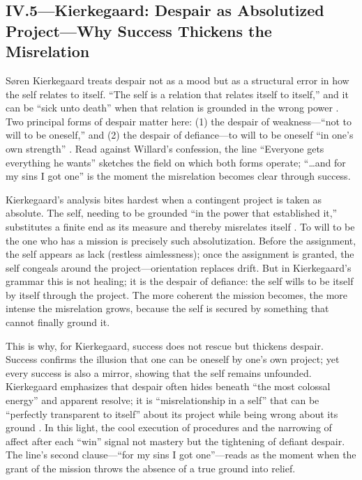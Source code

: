 \subsection*{IV.5—Kierkegaard: Despair as Absolutized Project—Why Success Thickens the
	Misrelation}
\label{ssec:iii-kierkegaard}
Søren Kierkegaard treats despair not as a mood but as a structural error in how the self relates
to itself. ``The self is a relation that relates itself to itself,'' and it can be ``sick unto
death'' when that relation is grounded in the wrong power
\parencite[pp.~49--52]{KierkegaardSUD1980}.
Two principal forms of despair matter here: (1) the despair of weakness—``not to will to be
oneself,'' and (2) the despair of defiance—to will to be oneself ``in one's own strength''
\parencite[pp.~52--61, 69--73]{KierkegaardSUD1980}. Read against Willard's confession, the line
``Everyone gets everything he wants'' sketches the field on which both forms operate;
``\ldots and for my sins I got one'' is the moment the misrelation becomes clear through
success.

Kierkegaard's analysis bites hardest when a contingent project is taken as absolute. The self,
needing to be grounded ``in the power that established it,'' substitutes a finite end as its
measure and thereby misrelates itself \parencite[pp.~79--83]{KierkegaardSUD1980}. To will to be
the one who has a mission is precisely such absolutization. Before the assignment, the self
appears as lack (restless aimlessness); once the assignment is granted, the self congeals around
the project—orientation replaces drift. But in Kierkegaard's grammar this is not healing; it is
the despair of defiance: the self wills to be itself by itself through the project. The more
coherent the mission becomes, the more intense the misrelation grows, because the self is
secured by something that cannot finally ground it.

This is why, for Kierkegaard, success does not rescue but thickens despair. Success confirms
the illusion that one can be oneself by one's own project; yet every success is also a mirror,
showing that the self remains unfounded. Kierkegaard emphasizes that despair often hides beneath
``the most colossal energy'' and apparent resolve; it is ``misrelationship in a self'' that can
be ``perfectly transparent to itself'' about its project while being wrong about its ground
\parencite[pp.~72--76]{KierkegaardSUD1980}. In this light, the cool execution of procedures and
the narrowing of affect after each ``win'' signal not mastery but the tightening of defiant
despair. The line's second clause—``for my sins I got one''—reads as the moment when the grant
of the mission throws the absence of a true ground into relief.

